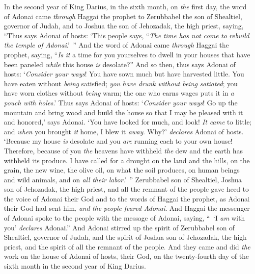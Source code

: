 
\begin{biblechapter} %
 In the second year of King Darius, in the sixth month, on \textit{the} first day, the word of Adonai came \textit{through} Haggai the prophet to Zerubbabel the son of Shealtiel, governor of Judah, and to Joshua the son of Jehozadak, the high priest, saying,
\verse “Thus says Adonai of hosts: ‘This people says, “\textit{The time has not come to rebuild the temple of Adonai}.’ ” 
\verse And the word of Adonai came \textit{through} Haggai the prophet, saying,
\verse “\textit{Is it} a time for you yourselves to dwell in your houses that have been paneled \textit{while} this house \textit{is} desolate?”
\verse And so then, thus says Adonai of hosts: ‘\textit{Consider your ways}!
\verse You have sown much but have harvested little. You have eaten without \textit{being} satisfied; \textit{you have drunk without being satiated}; you have worn clothes without \textit{being} warm; the one who earns wages puts it in \textit{a pouch with holes}.’
\verse Thus says Adonai of hosts: ‘\textit{Consider your ways}!
\verse Go up the mountain and bring wood and build the house so that I may be pleased with it and honored,’ says Adonai.
\verse ‘You have looked for much, and look! \textit{It came} to little; and \textit{when} you brought \textit{it} home, I blew it \textit{away}. Why?’ \textit{declares} Adonai of hosts. ‘Because my house \textit{is} desolate and you \textit{are} running each to your own house!
\verse Therefore, because of you \textit{the} heavens have withheld \textit{the} dew and the earth has withheld its produce.
\verse I have called for a drought on the land and the hills, on the grain, the new wine, the olive oil, on what the soil produces, on human beings and wild animals, and on \textit{all their labor}.’ ”
\verse Zerubbabel son of Shealtiel, Joshua son of Jehozadak, the high priest, and all the remnant of the people gave heed to the voice of Adonai their God and to the words of Haggai the prophet, as Adonai their God had sent him, \textit{and the people feared Adonai}.
\verse And Haggai the messenger of Adonai spoke to the people with the message of Adonai, saying, “ ‘I \textit{am} with you’ \textit{declares} Adonai.”
\verse And Adonai stirred up the spirit of Zerubbabel son of Shealtiel, governor of Judah, and the spirit of Joshua son of Jehozadak, the high priest, and the spirit of all the remnant of the people. And they came and did \textit{the} work on the house of Adonai of hosts, their God,
\verse on the twenty-fourth day of the sixth month in the second year of King Darius.
\end{biblechapter}

